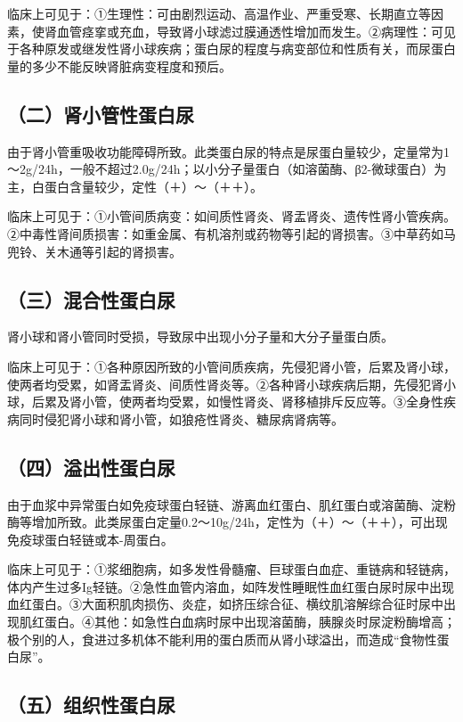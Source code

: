 临床上可见于：①生理性：可由剧烈运动、高温作业、严重受寒、长期直立等因素，使肾血管痉挛或充血，导致肾小球滤过膜通透性增加而发生。②病理性：可见于各种原发或继发性肾小球疾病；蛋白尿的程度与病变部位和性质有关，而尿蛋白量的多少不能反映肾脏病变程度和预后。

\subsection{（二）肾小管性蛋白尿}

由于肾小管重吸收功能障碍所致。此类蛋白尿的特点是尿蛋白量较少，定量常为1～2g/24h，一般不超过2.0g/24h；以小分子量蛋白（如溶菌酶、β2-微球蛋白）为主，白蛋白含量较少，定性（＋）～（＋＋）。

临床上可见于：①小管间质病变：如间质性肾炎、肾盂肾炎、遗传性肾小管疾病。②中毒性肾间质损害：如重金属、有机溶剂或药物等引起的肾损害。③中草药如马兜铃、关木通等引起的肾损害。

\subsection{（三）混合性蛋白尿}

肾小球和肾小管同时受损，导致尿中出现小分子量和大分子量蛋白质。

临床上可见于：①各种原因所致的小管间质疾病，先侵犯肾小管，后累及肾小球，使两者均受累，如肾盂肾炎、间质性肾炎等。②各种肾小球疾病后期，先侵犯肾小球，后累及肾小管，使两者均受累，如慢性肾炎、肾移植排斥反应等。③全身性疾病同时侵犯肾小球和肾小管，如狼疮性肾炎、糖尿病肾病等。

\subsection{（四）溢出性蛋白尿}

由于血浆中异常蛋白如免疫球蛋白轻链、游离血红蛋白、肌红蛋白或溶菌酶、淀粉酶等增加所致。此类尿蛋白定量0.2～10g/24h，定性为（＋）～（＋＋），可出现免疫球蛋白轻链或本-周蛋白。

临床上可见于：①浆细胞病，如多发性骨髓瘤、巨球蛋白血症、重链病和轻链病，体内产生过多Ig轻链。②急性血管内溶血，如阵发性睡眠性血红蛋白尿时尿中出现血红蛋白。③大面积肌肉损伤、炎症，如挤压综合征、横纹肌溶解综合征时尿中出现肌红蛋白。④其他：如急性白血病时尿中出现溶菌酶，胰腺炎时尿淀粉酶增高；极个别的人，食进过多机体不能利用的蛋白质而从肾小球溢出，而造成“食物性蛋白尿”。

\subsection{（五）组织性蛋白尿}

